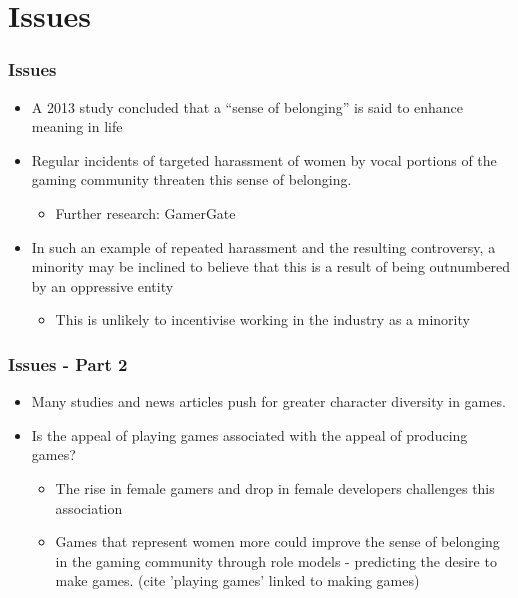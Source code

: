 \documentclass{beamer}
\begin{document}
\section{Issues}
\begin{frame}
    \frametitle{Issues}
    \begin{itemize}
        \item A 2013 study concluded that a ``sense of belonging'' is said to enhance meaning in life \cite{lambert_belonging_2013}
        \item Regular incidents of targeted harassment of women by vocal portions of the gaming community \cite{riot_lawsuit, gonzalez_boysclub_2014, perreault_gamergate_2018} threaten this sense of belonging.
        \begin{itemize}
        	\item Further research: GamerGate
        \end{itemize}
        \item In such an example of repeated harassment and the resulting controversy, a minority may be inclined to believe that this is a result of being outnumbered by an oppressive entity
        \begin{itemize}
        	\item This is unlikely to incentivise working in the industry as a minority
        \end{itemize}
    \end{itemize}
\end{frame}

\begin{frame}
	\frametitle{Issues - Part 2}
	\begin{itemize}
		\item Many studies and news articles push for greater character diversity in games.
		\item Is the appeal of playing games associated with the appeal of producing games?
		\begin{itemize}
			\item The rise in female gamers \cite{google_changethegame_2017} and drop in female developers \cite{igda_satisfaction_2014, igda_satisfaction_2017} challenges this association
		\end{itemize}
		\begin{itemize}
			\item Games that represent women more could improve the sense of belonging in the gaming community through role models - predicting the desire to make games. (cite 'playing games' linked to making games)
		\end{itemize}
	\end{itemize}
\end{frame}
\end{document}
